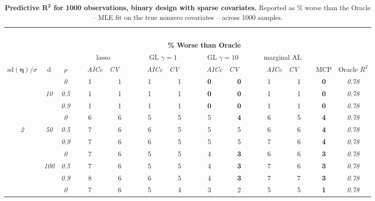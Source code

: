 \begin{table}
\vspace{-.2cm}
\footnotesize
\caption{ 
	{\bf  Predictive $\boldsymbol{R^2}$ for 1000 observations, 
	binary design with sparse covariates.}
  Reported as  \% worse than the Oracle 
  -- MLE fit on the true nonzero covariates -- 
  across 1000 samples.}
\begin{center}
\begin{tabular}{ccc|cc|cc|cc|cc|c|c}
\hline &&&\multicolumn{9}{|c|}{~}\\[-1ex]
\multicolumn{3}{c}{~}&\multicolumn{9}{|c|}{\bf \% Worse than Oracle } &   \\[1ex]
& &
& \multicolumn{2}{c}{lasso} 
& \multicolumn{2}{c}{GL $\gamma=1$} 
& \multicolumn{2}{c}{GL $\gamma=10$} 
& \multicolumn{2}{c}{marginal AL} 
& \multicolumn{1}{c|}{~} & \\[-0.5ex]
$\mathrm{sd}(\boldsymbol{\eta})/\sigma$ & {\sf d} & $\rho$ 
& ~~~\scriptsize\it AICc & \multicolumn{1}{c}{\scriptsize\it CV~~~}
& ~~~\scriptsize\it AICc & \multicolumn{1}{c}{\scriptsize\it CV~~~}
& ~~~\scriptsize\it AICc & \multicolumn{1}{c}{\scriptsize\it CV~~~}
& ~~~\scriptsize\it AICc & \multicolumn{1}{c}{\scriptsize\it CV~~~} 
& \multicolumn{1}{c|}{ MCP} & Oracle $R^2$ \\[.5ex]
\hline\rule{0pt}{3ex}
& & \it  0  & 1 & 1 & 1 & 1 & {\bf 0} & {\bf 0} & 1 & 1 & {\bf 0} & \it  0.78 \\
 & \it  10  & \it  0.5  & 1 & 1 & 1 & 1 & {\bf 0} & {\bf 0} & 1 & 1 & {\bf 0} & \it  0.78 \\
& & \it  0.9  & 1 & 1 & 1 & 1 & {\bf 0} & {\bf 0} & 1 & 1 & {\bf 0} & \it  0.78 \\[1ex]
\cline{2-3}\rule{0pt}{3ex}
& & \it  0  & 6 & 6 & 5 & 5 & 5 & {\bf 4} & 6 & 5 & {\bf 4} & \it  0.78 \\
\it  2  & \it  50  & \it  0.5  & 7 & 6 & 6 & 5 & 5 & 5 & 6 & 6 & {\bf 4} & \it  0.78 \\
& & \it  0.9  & 7 & 6 & 6 & 5 & 5 & 5 & 7 & 6 & {\bf 4} & \it  0.78 \\[1ex]
\cline{2-3}\rule{0pt}{3ex}
& & \it  0  & 7 & 6 & 5 & 5 & 4 & {\bf 3} & 6 & 6 & {\bf 3} & \it  0.78 \\
 & \it  100  & \it  0.5  & 7 & 6 & 5 & 5 & 4 & {\bf 3} & 7 & 6 & {\bf 3} & \it  0.78 \\
& & \it  0.9  & 8 & 6 & 6 & 5 & 4 & {\bf 3} & 7 & 7 & {\bf 3} & \it  0.78 \\[1ex]
\cline{2-3}\rule{0pt}{3ex}
& & \it  0  & 7 & 6 & 5 & 4 & 3 & 2 & 5 & 5 & {\bf 1} & \it  0.78 \\

\end{tabular}
\end{center}
\end{table}
